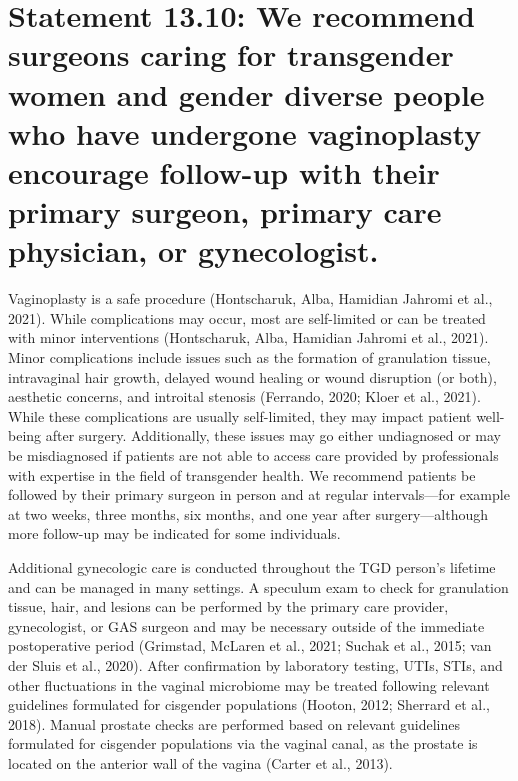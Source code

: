 \documentclass[
]{book}
\begin{document}
\hypertarget{statement-13.10-we-recommend-surgeons-caring-for-transgender-women-and-gender-diverse-people-who-have-undergone-vaginoplasty-encourage-follow-up-with-their-primary-surgeon-primary-care-physician-or-gynecologist.}{%
\section*{Statement 13.10: We recommend surgeons caring for transgender women and gender diverse people who have undergone vaginoplasty encourage follow-up with their primary surgeon, primary care physician, or gynecologist.}\label{statement-13.10-we-recommend-surgeons-caring-for-transgender-women-and-gender-diverse-people-who-have-undergone-vaginoplasty-encourage-follow-up-with-their-primary-surgeon-primary-care-physician-or-gynecologist.}}

Vaginoplasty is a safe procedure (Hontscharuk,
Alba, Hamidian Jahromi et al., 2021). While
complications may occur, most are self-limited
or can be treated with minor interventions
(Hontscharuk, Alba, Hamidian Jahromi et al.,
2021). Minor complications include issues such
as the formation of granulation tissue, intravaginal hair growth, delayed wound healing or
wound disruption (or both), aesthetic concerns,
and introital stenosis (Ferrando, 2020; Kloer
et al., 2021). While these complications are usually self-limited, they may impact patient
well-being after surgery. Additionally, these issues
may go either undiagnosed or may be misdiagnosed if patients are not able to access care provided by professionals with expertise in the field
of transgender health. We recommend patients
be followed by their primary surgeon in person
and at regular intervals---for example at two
weeks, three months, six months, and one year
after surgery---although more follow-up may be
indicated for some individuals.

Additional gynecologic care is conducted
throughout the TGD person's lifetime and can be
managed in many settings. A speculum exam to
check for granulation tissue, hair, and lesions can
be performed by the primary care provider, gynecologist, or GAS surgeon and may be necessary
outside of the immediate postoperative period
(Grimstad, McLaren et al., 2021; Suchak et al.,
2015; van der Sluis et al., 2020). After confirmation by laboratory testing, UTIs, STIs, and other
fluctuations in the vaginal microbiome may be
treated following relevant guidelines formulated
for cisgender populations (Hooton, 2012; Sherrard
et al., 2018). Manual prostate checks are performed based on relevant guidelines formulated
for cisgender populations via the vaginal canal,
as the prostate is located on the anterior wall of
the vagina (Carter et al., 2013).
\end{document}
